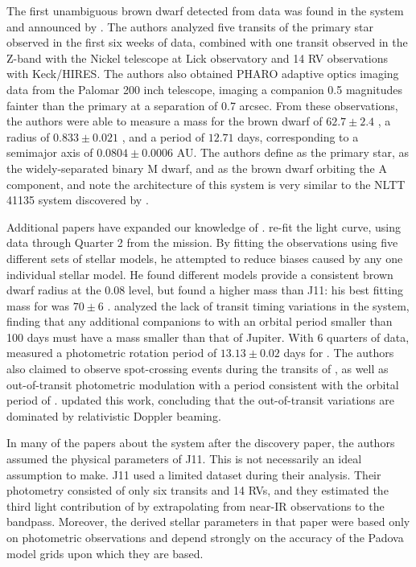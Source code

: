The first unambiguous brown dwarf detected from \itk{} data was found in the \LHS{} system and announced by \citet[hereafter J11]{Johnson11a}. 
The authors analyzed five transits of the primary star observed in the first six weeks of \itk{} data, combined with one transit observed in the Z-band with the Nickel telescope at Lick observatory and 14 RV observations with Keck/HIRES.  
The authors also obtained PHARO adaptive optics imaging data from the Palomar 200 inch telescope, imaging a companion 0.5 magnitudes fainter than the primary at a separation of 0.7 arcsec. 
From these observations, the authors were able to measure a mass for the brown dwarf of $62.7 \pm 2.4$ \mjup{}, a radius of $0.833 \pm 0.021$ \rjup, and a period of $12.71$ days, corresponding to a semimajor axis of $0.0804\pm0.0006$ AU.
The authors define \LA{} as the primary star, \LB{} as the widely-separated binary M dwarf, and \LC{} as the brown dwarf orbiting the A component, and note the architecture of this system is very similar to the NLTT\,41135 system discovered by \citet{Irwin10}.

Additional papers have expanded our knowledge of \LHS. 
\citet{Southworth11} re-fit the \itk{} light curve, using data through Quarter 2 from the mission. By fitting the observations using five different sets of stellar models, he attempted to reduce biases caused by any one individual stellar model. He found different models provide a consistent brown dwarf radius at the $0.08$ \rjup{} level, but found a higher mass than J11: his best fitting mass for \LC{} was $70 \pm 6$ \mjup.
\citet{Oshagh12} analyzed the lack of transit timing variations in the system, finding that any additional companions to \LA{} with an orbital period smaller than 100 days must have a mass smaller than that of Jupiter. 
With 6 quarters of \itk{} data, \citet{Herrero13} measured a photometric rotation period of $13.13 \pm 0.02$ days for \LA. 
The authors also claimed to observe spot-crossing events during the transits of \LA{}, as well as out-of-transit photometric modulation with a period consistent with the orbital period of \LC. 
\citet{Herrero14} updated this work, concluding that the out-of-transit variations are dominated by relativistic Doppler beaming.

In many of the papers about the \LHS{} system after the discovery paper, the authors assumed the physical parameters of J11. 
This is not necessarily an ideal assumption to make.
J11 used a limited dataset during their analysis.
Their photometry consisted of only six transits and 14 RVs, and they estimated the third light contribution of \LB{} by extrapolating from near-IR observations to the \itk{} bandpass.
Moreover, the derived stellar parameters in that paper were based only on photometric observations and depend strongly on the accuracy of the Padova model grids \citep{Girardi02} upon which they are based.


